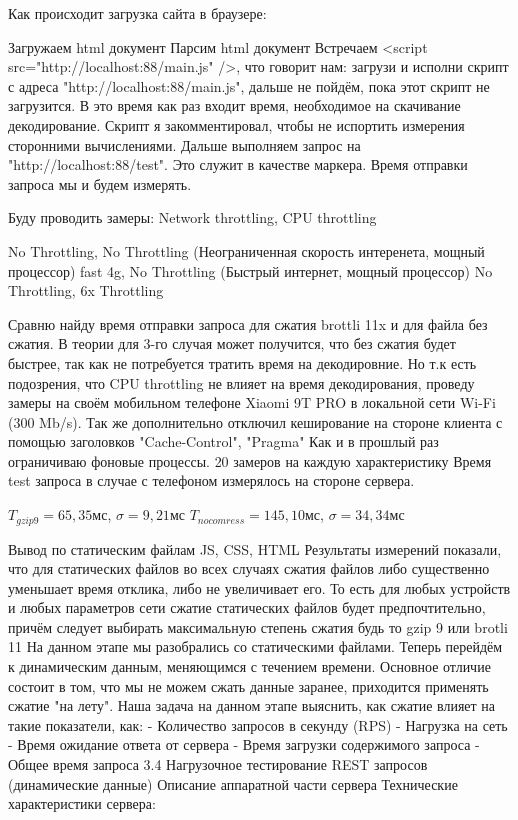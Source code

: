 \documentclass[12pt]{article}
\begin{document}
Как происходит загрузка сайта в браузере:

Загружаем html документ
Парсим html документ
Встречаем <script src="http://localhost:88/main.js" />, что говорит нам: загрузи и исполни скрипт с адреса "http://localhost:88/main.js",
дальше не пойдём, пока этот скрипт не загрузится. В это время как раз входит время, необходимое на скачивание декодирование.
Скрипт я закомментировал, чтобы не испортить измерения сторонними вычислениями.
Дальше выполняем запрос на "http://localhost:88/test". Это служит в качестве маркера. Время отправки запроса мы и будем измерять.

Буду проводить замеры:
Network throttling, CPU throttling

No Throttling, No Throttling (Неограниченная скорость интеренета, мощный процессор)
fast 4g, No Throttling (Быстрый интернет, мощный процессор)
No Throttling, 6x Throttling

Сравню найду время отправки запроса для сжатия brottli 11x и для файла без сжатия. В теории для 3-го случая может получится, что без сжатия будет быстрее,
так как не потребуется тратить время на декодировние.
Но т.к есть подозрения, что CPU throttling не влияет на время декодирования, проведу замеры на своём мобильном телефоне Xiaomi 9T PRO в локальной сети Wi-Fi (300 Mb/s).
Так же дополнительно отключил кеширование на стороне клиента с помощью заголовков "Cache-Control", "Pragma"
Как и в прошлый раз ограничиваю фоновые процессы. 20 замеров на каждую характеристику
Время test запроса в случае с телефоном измерялось на стороне сервера.

$T_{gzip9}=65,35$мс, $\sigma = 9,21$мс
$T_{no comress}=145,10$мс, $\sigma = 34,34$мс

Вывод по статическим файлам JS, CSS, HTML
Результаты измерений показали, что для статических файлов во всех случаях сжатия файлов либо существенно уменьшает время отклика, либо не увеличивает его.
То есть для любых устройств и любых параметров сети сжатие статических файлов будет предпочтительно, причём следует выбирать максимальную степень сжатия будь то gzip 9 или brotli 11
На данном этапе мы разобрались со статическими файлами. Теперь перейдём к динамическим данным, меняющимся с течением времени. Основное отличие состоит в том, что мы не можем сжать данные заранее, приходится применять сжатие "на лету". Наша задача на данном этапе выяснить, как сжатие влияет на такие показатели, как: 
- Количество запросов в секунду (RPS)
- Нагрузка на сеть
- Время ожидание ответа от сервера 
- Время загрузки содержимого запроса
- Общее время запроса
3.4 Нагрузочное тестирование REST запросов (динамические данные)
Описание аппаратной части сервера
Технические характеристики сервера:
\end{document}
